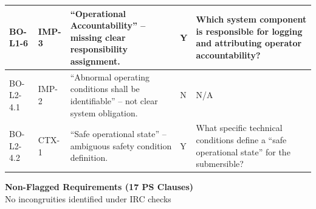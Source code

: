 \documentclass[11pt,a4paper]{article}
\begin{document}
\begin{longtable}{|p{}|p{}|p{}|p{}|p{}|}
\rowcolor{flagrow}
BO-L1-6 & IMP-3 & ``Operational Accountability'' -- missing clear responsibility assignment. & Y & Which system component is responsible for logging and attributing operator accountability? \\
\hline

\rowcolor{flagrow}
BO-L2-4.1 & IMP-2 & ``Abnormal operating conditions shall be identifiable'' -- not clear system obligation. & N & N/A \\
\hline

\rowcolor{flagrow}
BO-L2-4.2 & CTX-1 & ``Safe operational state'' -- ambiguous safety condition definition. & Y & What specific technical conditions define a ``safe operational state'' for the submersible? \\
\hline

\end{longtable}

\newpage


\begin{center}
{\Large \textbf{Non-Flagged Requirements (17 PS Clauses)}}\\[4pt]
{\normalsize No incongruities identified under IRC checks}
\end{center}

\vspace{8pt}
\end{document}
